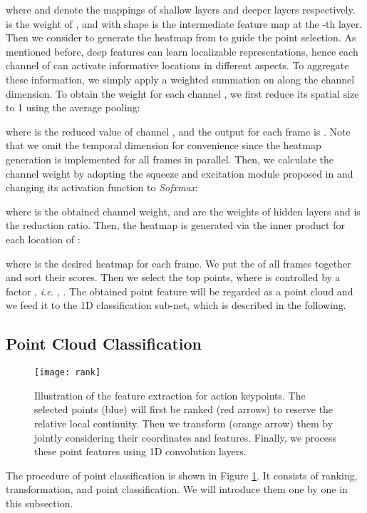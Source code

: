 \documentclass[journal]{IEEEtran}
\newcommand{\ie}{\textit{i}.\textit{e}. }
\begin{document}
where  and  denote the mappings of shallow layers and deeper layers respectively.
 is the weight of , and  with shape  is the intermediate feature map at the -th layer.
Then we consider to generate the heatmap from  to guide the point selection.
As mentioned before, deep features can learn localizable representations, hence each channel of  can activate informative locations in different aspects.
To aggregate these information, we simply apply a weighted summation on  along the channel dimension.
To obtain the weight for each channel , we first reduce its spatial size to 1 using the average pooling:

where  is the reduced value of channel , and the output for each frame is .
Note that we omit the temporal dimension for convenience since the heatmap generation is implemented for all frames in parallel.
Then, we calculate the channel weight by adopting the squeeze and excitation module proposed in \cite{2018senet} and changing its activation function to \textit{Sofxmax}:

where  is the obtained channel weight,  and  are the weights of hidden layers and  is the reduction ratio.
Then, the heatmap is generated via the inner product for each location of :

where  is the desired heatmap for each frame.
We put the  of all frames together and sort their scores.
Then we select the top  points, where  is controlled by a factor , \ie, .
The obtained point feature  will be regarded as a point cloud and we feed it to the 1D classification sub-net, which is described in the following.

\subsection{Point Cloud Classification}

\begin{figure}[ht]
	\centering
	\texttt{[image: rank]}
	\caption{Illustration of the feature extraction for action keypoints.
	The selected points (blue) will first be ranked (red arrows) to reserve the relative local continuity.
	Then we transform (orange arrow) them by jointly considering their coordinates and features.
	Finally, we process these point features using 1D convolution layers.
	}
	\label{fig:rank}
\end{figure}

The procedure of point classification is shown in Figure \ref{fig:rank}.
It consists of ranking, transformation, and point classification.
We will introduce them one by one in this subsection.
\end{document}
